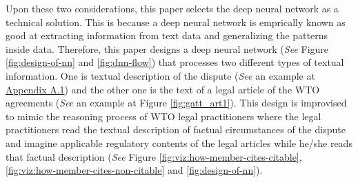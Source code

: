 Upon these two considerations, this paper selects the deep neural network as a technical solution. %
This is because a deep neural network is emprically known as good at extracting information from text data and generalizing the patterns inside data. 
Therefore, this paper designs a deep neural network (\textit{See} Figure \ref{fig:design-of-nn} and \ref{fig:dnn-flow}) that
processes two different types of textual information.
One is textual description of the dispute (\textit{See} an example at \hyperref[sub:factual-aspect-example]{Appendix A.1}) and
the other one is the text of a legal article of the WTO agreements (\textit{See} an example at Figure \ref{fig:gatt_art1}).
This design is improvised to mimic
the reasoning process of WTO legal practitioners
where the legal practitioners read
the textual description of
factual circumstances of the dispute and imagine applicable regulatory contents of
the legal articles while he/she reads that factual description (\textit{See} Figure \ref{fig:viz:how-member-cites-citable}, \ref{fig:viz:how-member-cites-non-citable} and \ref{fig:design-of-nn}).






